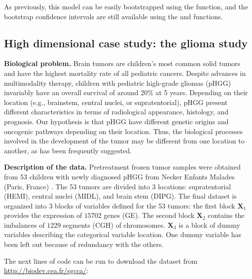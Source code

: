 \documentclass[
]{jss}
\begin{document}
\normalsize

As previously, this model can be easily bootstrapped using the
 function, and the bootstrap confidence
intervals are still available using the  and
 functions.

\hypertarget{high-dimensional-case-study-the-glioma-study}{%
\subsection{High dimensional case study: the glioma
study}\label{high-dimensional-case-study-the-glioma-study}}

\textbf{Biological problem.} Brain tumors are children's most common
solid tumors and have the highest mortality rate of all pediatric
cancers. Despite advances in multimodality therapy, children with
pediatric high-grade gliomas (pHGG) invariably have an overall survival
of around 20\% at 5 years. Depending on their location (e.g., brainstem,
central nuclei, or supratentorial), pHGG present different
characteristics in terms of radiological appearance, histology, and
prognosis. Our hypothesis is that pHGG have different genetic origins
and oncogenic pathways depending on their location. Thus, the biological
processes involved in the development of the tumor may be different from
one location to another, as has been frequently suggested.

\textbf{Description of the data.} Pretreatment frozen tumor samples were
obtained from 53 children with newly diagnosed pHGG from Necker Enfants
Malades (Paris, France) \citep{Puget2012}. The 53 tumors are divided
into 3 locations: supratentorial (HEMI), central nuclei (MIDL), and
brain stem (DIPG). The final dataset is organized into 3 blocks of
variables defined for the 53 tumors: the first block \(\mathbf{X}_1\)
provides the expression of \(15702\) genes (GE). The second block
\(\mathbf{X}_2\) contains the imbalances of \(1229\) segments (CGH) of
chromosomes. \(\mathbf{X}_3\) is a block of dummy variables describing
the categorical variable location. One dummy variable has been left out
because of redundancy with the others.

The next lines of code can be run to download the dataset from
\url{http://biodev.cea.fr/sgcca/}:

\footnotesize

\begin{CodeChunk}
\end{CodeChunk}
\end{document}

